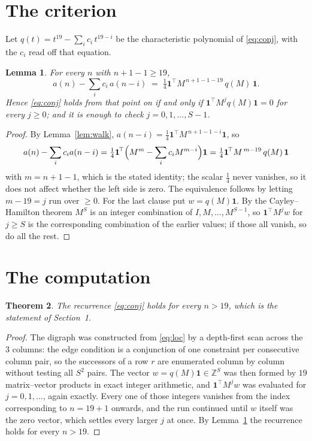 \documentclass[11pt,a4paper]{article}
\theoremstyle{plain}
\newtheorem{theorem}{Theorem}
\newtheorem{lemma}[theorem]{Lemma}
\theoremstyle{definition}
\begin{document}
\section{The criterion}

Let $q(t)=t^{19}-\sum_i c_i\,t^{19-i}$ be the characteristic polynomial of
\eqref{eq:conj}, with the $c_i$ read off that equation.

\begin{lemma}\label{lem:crit}
For every $n$ with $n+1-1\ge19$,
\[
a(n)-\sum_i c_i\,a(n-i)\;=\;\tfrac1{4}\mathbf{1}^{\!\top}M^{\,n+1-1-19}\,q(M)\,\mathbf{1} .
\]
Hence \eqref{eq:conj} holds from that point on if and only if
$\mathbf{1}^{\!\top}M^{j}q(M)\mathbf{1}=0$ for every $j\ge0$; and it is enough to check
$j=0,1,\dots,S-1$.
\end{lemma}

\begin{proof}
By Lemma~\ref{lem:walk}, $a(n-i)=\tfrac1{4}\mathbf{1}^{\!\top}M^{\,n+1-1-i}\mathbf{1}$, so
\[
a(n)-\sum_i c_i a(n-i)
=\tfrac1{4}\mathbf{1}^{\!\top}\Bigl(M^{m}-\sum_i c_i M^{m-i}\Bigr)\mathbf{1}
=\tfrac1{4}\mathbf{1}^{\!\top}M^{\,m-19}\,q(M)\,\mathbf{1}
\]
with $m=n+1-1$, which is the stated identity; the scalar $\tfrac1{4}$ never vanishes, so
it does not affect whether the left side is zero. The equivalence follows by letting
$m-19=j$ run over $\ge0$. For the last clause put $w=q(M)\mathbf{1}$. By the
Cayley--Hamilton theorem $M^{S}$ is an integer combination of $I,M,\dots,M^{S-1}$, so
$\mathbf{1}^{\!\top}M^{j}w$ for $j\ge S$ is the corresponding combination of the earlier
values; if those all vanish, so do all the rest.
\end{proof}

\section{The computation}

\begin{theorem}
The recurrence \eqref{eq:conj} holds for every $n>19$, which is the statement of
Section~1.
\end{theorem}

\begin{proof}
The digraph was constructed from \eqref{eq:loc} by a depth-first scan across the $3$
columns: the edge condition is a conjunction of one constraint per consecutive column
pair, so the successors of a row $r$ are enumerated column by column without testing all
$S^2$ pairs. The vector $w=q(M)\mathbf{1}\in\mathbb{Z}^{S}$ was then formed by $19$
matrix--vector products in exact integer arithmetic, and $\mathbf{1}^{\!\top}M^{j}w$ was
evaluated for $j=0,1,\dots$, again exactly. Every one of those integers vanishes from the
index corresponding to $n=19+1$ onwards, and the run continued until $w$ itself was the
zero vector, which settles every larger $j$ at once. By Lemma~\ref{lem:crit} the recurrence
holds for every $n>19$.
\end{proof}
\end{document}
